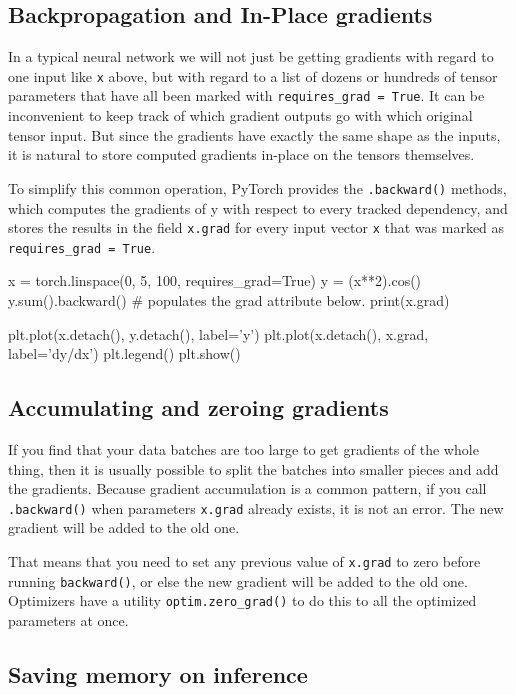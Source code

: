 \subsection{Backpropagation and In-Place gradients}

In a typical neural network we will not just be getting gradients with regard to one input like \texttt{x} above, but with regard to a list of dozens or hundreds of tensor parameters that have all been marked with \texttt{requires\_grad = True}. It can be inconvenient to keep track of which gradient outputs go with which original tensor input. But since the gradients have exactly the same shape as the inputs, it is natural to store computed gradients in-place on the tensors themselves. 

To simplify this common operation, PyTorch provides the \texttt{.backward()} methods, which computes the gradients of y with respect to every tracked dependency, and stores the results in the field \texttt{x.grad} for every input vector \texttt{x} that was marked as \texttt{requires\_grad = True}. 

\begin{codeblock}[language=python]
x = torch.linspace(0, 5, 100, requires_grad=True)
y = (x**2).cos()
y.sum().backward()   # populates the grad attribute below.
print(x.grad)

plt.plot(x.detach(), y.detach(), label='y')
plt.plot(x.detach(), x.grad, label='dy/dx')
plt.legend()
plt.show()
\end{codeblock}

\subsection{Accumulating and zeroing gradients}

If you find that your data batches are too large to get gradients of the whole thing, then it is usually possible to split the batches into smaller pieces and add the gradients. Because gradient accumulation is a common pattern, if you call \texttt{.backward()} when parameters \texttt{x.grad} already exists, it is not an error. The new gradient will be added to the old one. 

That means that you need to set any previous value of \texttt{x.grad} to zero before running \texttt{backward()}, or else the new gradient will be added to the old one. Optimizers have a utility \texttt{optim.zero\_grad()} to do this to all the optimized parameters at once. 

\subsection{Saving memory on inference}

